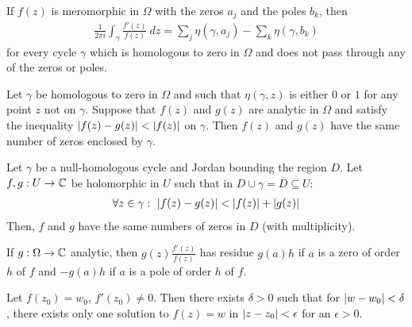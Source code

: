 \begin{theorem}
    If $f(z)$ is meromorphic in $\Omega$ with the zeros $a_j$ and the poles $b_k$,
    then
    \begin{align*}
        \frac{1}{2 \pi i} \int_\gamma \frac{f'(z)}{f(z)} \ dz =
        \sum_j \eta(\gamma,a_j) - \sum_k \eta(\gamma,b_k)
    \end{align*}
    for every cycle $\gamma$ which is homologous to zero in $\Omega$ and does not
    pass through any of the zeros or poles.
\end{theorem}

\begin{theorem}[Rouché]
    Let $\gamma$ be homologous to zero in $\Omega$ and such that $\eta(\gamma,z)$
    is either $0$ or $1$ for any point $z$ not on $\gamma$. Suppose that $f(z)$ and
    $g(z)$ are analytic in $\Omega$ and satisfy the inequality
    $\left\vert f(z) - g(z) \right\vert < \left\vert f(z) \right\vert$ on $\gamma$. Then $f(z)$ and $g(z)$ have the same
    number of zeros enclosed by $\gamma$.
\end{theorem}

\begin{theorem}[Rouché]
    Let $\gamma$ be a null-homologous cycle and Jordan bounding the region $D$. Let
    $f,g : U \rightarrow \mathbb{C}$ be holomorphic in $U$ such that in $D \cup \gamma =
    \overline{D} \subseteq U$:
    \begin{align*}
        \forall z \in \gamma: \ \left\vert f(z) - g(z) \right\vert < \left\vert f(z) \right\vert + \left\vert g(z) \right\vert
    \end{align*}
    Then, $f$ and $g$ have the same numbers of zeros in $D$ (with multiplicity).
\end{theorem}

\begin{theorem}
    If $g: \Omega \rightarrow \mathbb{C}$ analytic, then $g(z) \frac{f'(z)}{f(z)}$ has
    residue $g(a) h$ if $a$ is a zero of order $h$ of $f$ and $-g(a) h$ if $a$
    is a pole of order $h$ of $f$.
\end{theorem}

\begin{theorem}
    Let $f(z_0) = w_0$, $f'(z_0) \neq 0$. Then there exists $\delta > 0$ such that
    for $\left\vert w - w_0 \right\vert < \delta$, there exists only one solution to
    $f(z) = w$ in $\left\vert z-z_0 \right\vert < \epsilon$ for an $\epsilon > 0$.
\end{theorem}

